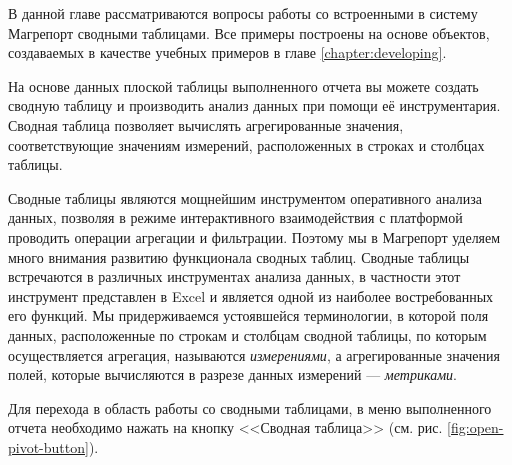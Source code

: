 \documentclass[../user-manual.tex]{subfiles}
\begin{document}
	В данной главе рассматриваются вопросы работы со встроенными в систему Магрепорт сводными таблицами. Все примеры построены на основе объектов, создаваемых в качестве учебных примеров в главе \ref{chapter:developing}.
	
	На основе данных плоской таблицы выполненного отчета вы можете создать сводную таблицу и производить анализ данных при помощи её инструментария. Сводная таблица позволяет вычислять агрегированные значения, соответствующие значениям измерений, расположенных в строках и столбцах таблицы.
	
	\begin{concept}
		Сводные таблицы являются мощнейшим инструментом оперативного анализа данных, позволяя в режиме интерактивного взаимодействия с платформой проводить операции агрегации и фильтрации. Поэтому мы в Магрепорт уделяем много внимания развитию функционала сводных таблиц. Сводные таблицы встречаются в различных инструментах анализа данных, в частности этот инструмент представлен в Excel и является одной из наиболее востребованных его функций. Мы придерживаемся устоявшейся терминологии, в которой поля данных, расположенные по строкам и столбцам сводной таблицы, по которым осуществляется агрегация, называются \textit{измерениями}, а агрегированные значения полей, которые вычисляются в разрезе данных измерений --- \textit{метриками}.
	\end{concept}
	
%		
%				
%						
%			
%			
%			
	
	Для перехода в область работы со сводными таблицами, в меню выполненного отчета необходимо нажать на кнопку <<Сводная таблица>> (см. рис. \ref{fig:open-pivot-button}).
	
\end{document}
